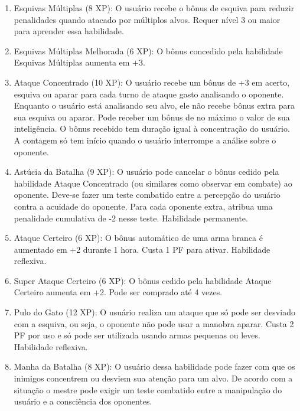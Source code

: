 \begin{enumerate}
	\item Esquivas Múltiplas (8 XP): O usuário recebe o bônus de esquiva para reduzir penalidades quando atacado por múltiplos alvos. Requer nível 3 ou maior para aprender essa habilidade.	

	\item Esquivas Múltiplas Melhorada (6 XP): O bônus concedido pela habilidade Esquivas Múltiplas aumenta em +3. 
			
	\item Ataque Concentrado (10 XP): O usuário recebe um bônus de +3 em acerto, esquiva ou aparar para cada turno de ataque gasto analisando o oponente. Enquanto o usuário está analisando seu alvo, ele não recebe bônus extra para sua esquiva ou aparar. Pode receber um bônus de no máximo o valor de sua inteligência. O bônus recebido tem duração igual à concentração do usuário. A contagem só tem início quando o usuário interrompe a análise sobre o oponente.

	\item Astúcia da Batalha (9 XP): O usuário pode cancelar o bônus cedido pela habilidade Ataque Concentrado (ou similares como observar em combate) ao oponente. Deve-se fazer um teste combatido entre a percepção do usuário contra a acuidade do oponente. Para cada oponente extra, atribua uma penalidade cumulativa de -2 nesse teste. Habilidade permanente.
	
	\item Ataque Certeiro (6 XP): O bônus automático de uma arma branca é aumentado em +2 durante 1 hora. Custa 1 PF para ativar. Habilidade reflexiva.
	
	\item Super Ataque Certeiro (6 XP): O bônus cedido pela habilidade Ataque Certeiro aumenta em +2. Pode ser comprado até 4 vezes.
	
	\item Pulo do Gato (12 XP): O usuário realiza um ataque que só pode ser desviado com a esquiva, ou seja, o oponente não pode usar a manobra aparar. Custa 2 PF por uso e só pode ser utilizada usando armas pequenas ou leves. Habilidade reflexiva.
		
	\item Manha da Batalha (8 XP): O usuário dessa habilidade pode fazer com que os inimigos concentrem ou desviem sua atenção para um alvo. De acordo com a situação o mestre pode exigir um teste combatido entre a manipulação do usuário e a consciência dos oponentes.


\end{enumerate}

